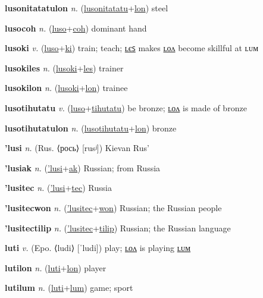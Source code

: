 \textbf{\hypertarget{lusonitatatulon}{lusonitatatulon}} \textit{n.} (\hyperlink{lusonitatatu}{lusonitatatu}+\allowbreak \hyperlink{lon}{lon})
steel

\textbf{\hypertarget{lusocoh}{lusocoh}} \textit{n.} (\hyperlink{luso}{luso}+\allowbreak \hyperlink{coh}{coh})
dominant hand

\textbf{\hypertarget{lusoki}{lusoki}} \textit{v.} (\hyperlink{luso}{luso}+\allowbreak \hyperlink{ki}{ki})
train; teach; \hyperlink{lusokiles}{ʟєꜱ} makes \hyperlink{lusokilon}{ʟᴏᴧ} become skillful at ʟᴜᴍ

\textbf{\hypertarget{lusokiles}{lusokiles}} \textit{n.} (\hyperlink{lusoki}{lusoki}+\allowbreak \hyperlink{les}{les})
trainer

\textbf{\hypertarget{lusokilon}{lusokilon}} \textit{n.} (\hyperlink{lusoki}{lusoki}+\allowbreak \hyperlink{lon}{lon})
trainee

\textbf{\hypertarget{lusotihutatu}{lusotihutatu}} \textit{v.} (\hyperlink{luso}{luso}+\allowbreak \hyperlink{tihutatu}{tihutatu})
be bronze; \hyperlink{lusotihutatulon}{ʟᴏᴧ} is made of bronze

\textbf{\hypertarget{lusotihutatulon}{lusotihutatulon}} \textit{n.} (\hyperlink{lusotihutatu}{lusotihutatu}+\allowbreak \hyperlink{lon}{lon})
bronze

\textbf{\hypertarget{'lusi}{'lusi}} \textit{n.} (Rus. ⟨рось⟩ [rusʲ])
Kievan Rus’

\textbf{\hypertarget{'lusiak}{'lusiak}} \textit{n.} (\hyperlink{'lusi}{'lusi}+\allowbreak \hyperlink{ak}{ak})
Russian; from Russia

\textbf{\hypertarget{'lusitec}{'lusitec}} \textit{n.} (\hyperlink{'lusi}{'lusi}+\allowbreak \hyperlink{tec}{tec})
Russia

\textbf{\hypertarget{'lusitecwon}{'lusitecwon}} \textit{n.} (\hyperlink{'lusitec}{'lusitec}+\allowbreak \hyperlink{won}{won})
Russian; the Russian people

\textbf{\hypertarget{'lusitectilip}{'lusitectilip}} \textit{n.} (\hyperlink{'lusitec}{'lusitec}+\allowbreak \hyperlink{tilip}{tilip})
Russian; the Russian language

\textbf{\hypertarget{luti}{luti}} \textit{v.} (Epo. ⟨ludi⟩ [ˈludi])
play; \hyperlink{lutilon}{ʟᴏᴧ} is playing \hyperlink{lutilum}{ʟᴜᴍ}

\textbf{\hypertarget{lutilon}{lutilon}} \textit{n.} (\hyperlink{luti}{luti}+\allowbreak \hyperlink{lon}{lon})
player

\textbf{\hypertarget{lutilum}{lutilum}} \textit{n.} (\hyperlink{luti}{luti}+\allowbreak \hyperlink{lum}{lum})
game; sport

